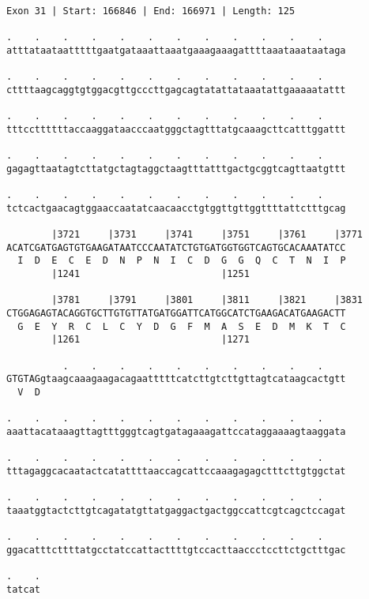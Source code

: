 \documentclass{article}
\begin{document}
\begin{Verbatim}[fontfamily=courier]
Exon 31 | Start: 166846 | End: 166971 | Length: 125

.    .    .    .    .    .    .    .    .    .    .    .    
atttataataatttttgaatgataaattaaatgaaagaaagattttaaataaataataga

.    .    .    .    .    .    .    .    .    .    .    .    
cttttaagcaggtgtggacgttgcccttgagcagtatattataaatattgaaaaatattt

.    .    .    .    .    .    .    .    .    .    .    .    
tttccttttttaccaaggataacccaatgggctagtttatgcaaagcttcatttggattt

.    .    .    .    .    .    .    .    .    .    .    .    
gagagttaatagtcttatgctagtaggctaagtttatttgactgcggtcagttaatgttt

.    .    .    .    .    .    .    .    .    .    .    .    
tctcactgaacagtggaaccaatatcaacaacctgtggttgttggttttattctttgcag

        |3721     |3731     |3741     |3751     |3761     |3771
ACATCGATGAGTGTGAAGATAATCCCAATATCTGTGATGGTGGTCAGTGCACAAATATCC
  I  D  E  C  E  D  N  P  N  I  C  D  G  G  Q  C  T  N  I  P
        |1241                         |1251                 

        |3781     |3791     |3801     |3811     |3821     |3831
CTGGAGAGTACAGGTGCTTGTGTTATGATGGATTCATGGCATCTGAAGACATGAAGACTT
  G  E  Y  R  C  L  C  Y  D  G  F  M  A  S  E  D  M  K  T  C
        |1261                         |1271                 

          .    .    .    .    .    .    .    .    .    .    
GTGTAGgtaagcaaagaagacagaatttttcatcttgtcttgttagtcataagcactgtt
  V  D                                                      

.    .    .    .    .    .    .    .    .    .    .    .    
aaattacataaagttagtttgggtcagtgatagaaagattccataggaaaagtaaggata

.    .    .    .    .    .    .    .    .    .    .    .    
tttagaggcacaatactcatattttaaccagcattccaaagagagctttcttgtggctat

.    .    .    .    .    .    .    .    .    .    .    .    
taaatggtactcttgtcagatatgttatgaggactgactggccattcgtcagctccagat

.    .    .    .    .    .    .    .    .    .    .    .    
ggacatttcttttatgcctatccattacttttgtccacttaaccctccttctgctttgac

.    .
tatcat
\end{Verbatim}
\newpage
\end{document}
